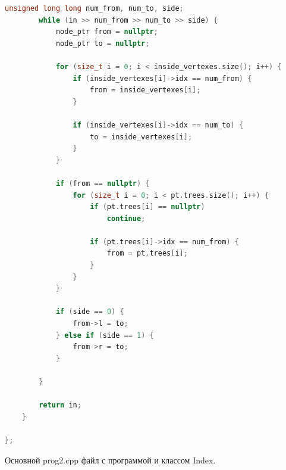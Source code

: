 \begin{lstlisting}[language=c++]
		unsigned long long num_from, num_to, side;
		while (in >> num_from >> num_to >> side) {
			node_ptr from = nullptr;
			node_ptr to = nullptr;

			for (size_t i = 0; i < inside_vertexes.size(); i++) {
				if (inside_vertexes[i]->idx == num_from) {
					from = inside_vertexes[i];
				}

				if (inside_vertexes[i]->idx == num_to) {
					to = inside_vertexes[i];
				}
			}

			if (from == nullptr) {
				for (size_t i = 0; i < pt.trees.size(); i++) {
					if (pt.trees[i] == nullptr) 
						continue;
					
					if (pt.trees[i]->idx == num_from) {
						from = pt.trees[i];
					}
				}
			}

			if (side == 0) {
				from->l = to;
			} else if (side == 1) {
				from->r = to;
			}

		}

		return in;
	}

};
\end{lstlisting}

Основной prog2.cpp файл с программой и классом Index.

